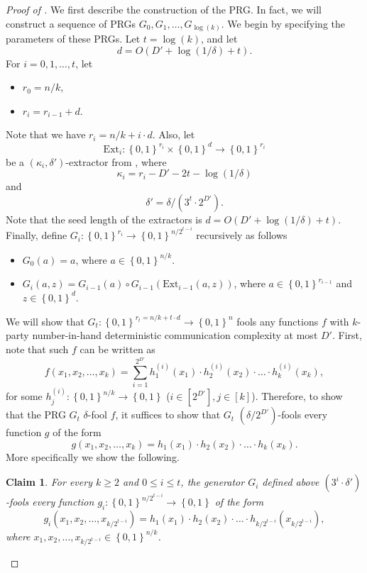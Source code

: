 \documentclass[10pt,a4paper]{article}
\newtheorem{claim}[theorem]{Claim}
\newcommand{\bool}{\left\{0,1\right\}}
\begin{document}
	\begin{proof}[Proof of ]\renewcommand{\qedsymbol}{$\square$ (\Cref{thm:prg-lc})}
	    We first describe the construction of the PRG. In fact, we will construct a sequence of PRGs $G_0,G_1,\dots,G_{\log(k)}$. We begin by specifying the parameters of these PRGs.
	    Let $t=\log(k)$, and let
	    \[
	    	d=O\left(D'+\log(1/\delta)+t\right).
	    \]
	    For $i=0,1,\dots,t$, let
	    \begin{itemize}
	        \item $r_0=n/k$,
	        \item $r_i=r_{i-1}+d$.
	    \end{itemize}
	    Note that we have $r_i=n/k+i\cdot d$. Also, let
	    \[
	    	\mathrm{Ext}_i\colon\bool^{r_i}\times\bool^d\to\bool^{r_i}
	    \]
	    be a $(\kappa_i,\delta')$-extractor from , where
	    \[
	    	\kappa_i=r_i-D'-2t - \log(1/\delta)
	    \] 
	    and
	    \[
	        \delta'=\delta/\left(3^t\cdot 2^{D'}\right).
	    \]
	    Note that the seed length of the extractors is $d=O\left(D'+\log(1/\delta)+t\right)$. Finally, define $G_i\colon\bool^{r_i}\to\bool^{n/2^{t-i}}$ recursively as follows
	    \begin{itemize}
	    	\item $G_{0}(a)=a$, where $a\in\bool^{n/k}$.
	    	\item $G_i(a,z)=G_{i-1}(a)\circ G_{i-1}(\mathrm{Ext}_{i-1}(a,z))$, where $a\in\bool^{r_{i-1}}$ and $z\in\bool^d$.
	    \end{itemize}
	    We will show that $G_t\colon\bool^{r_t=n/k+t\cdot d}\to\bool^n$ fools any functions $f$ with $k$-party number-in-hand deterministic communication complexity at most $D'$.
	    First, note that such $f$ can be written as
	    \[
	    	f(x_1,x_2,\dots,x_k)=\sum_{i=1}^{2^{D'}} h^{(i)}_{1}(x_1)\cdot h^{(i)}_{2}(x_2)\cdot\ldots\cdot h^{(i)}_{k}(x_k),
	    \]
	    for some $h^{(i)}_{j}\colon\bool^{n/k}\to \bool$ ($i\in\left[2^{D'}\right], j\in[k]$).
	    Therefore, to show that the PRG $G_t$ $\delta$-fool $f$, it suffices to show that $G_t$ $\left(\delta/2^{D'}\right)$-fools every function $g$ of the form
	    \[
	    	g(x_1,x_2,\dots,x_k)=h_1(x_1)\cdot h_2(x_2)\cdot\ldots\cdot h_k(x_k).
	    \]
	    More specifically we show the following.
	    
	    \begin{claim}\label{lem:prg-lc-claim-1}
	    	For every $k \geq 2$ and $  0\leq i \leq t$, the generator $G_i$ defined above $\left(3^{i}\cdot \delta'\right)$-fools every function $g_i\colon\bool^{n/2^{t-i}}\to\bool$ of the form
	    	\[
	    		g_i(x_1,x_2,\dots,x_{k/2^{t-i}})=h_1(x_1)\cdot h_2(x_2)\cdot\ldots\cdot h_{k/2^{t-i}}(x_{k/2^{t-i}}),
	    	\]
	    	where $x_1,x_2,\dots,x_{k/2^{t-i}}\in\bool^{n/k}$.
	    \end{claim}
	    

\end{proof}
\end{document}
